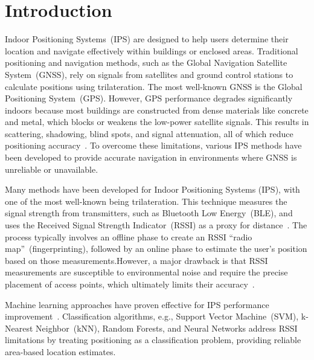 \documentclass[runningheads]{llncs}
\begin{document}

\section{Introduction}\label{sec:introduction}

Indoor Positioning Systems~(IPS) are designed to help users determine their location and navigate effectively within buildings or enclosed areas. Traditional positioning and navigation methods, such as the Global Navigation Satellite System~(GNSS), rely on signals from satellites and ground control stations to calculate positions using trilateration. The most well-known GNSS is the Global Positioning System~(GPS). However, GPS performance degrades significantly indoors because most buildings are constructed from dense materials like concrete and metal, which blocks or weakens the low-power satellite signals. This results in scattering, shadowing, blind spots, and signal attenuation, all of which reduce positioning accuracy~\cite{bgp1}. To overcome these limitations, various IPS methods have been developed to provide accurate navigation in environments where GNSS is unreliable or unavailable.

Many methods have been developed for Indoor Positioning Systems (IPS), with one of the most well-known being trilateration. This technique measures the signal strength from transmitters, such as Bluetooth Low Energy~(BLE), and uses the Received Signal Strength Indicator~(RSSI) as a proxy for distance~\cite{bg2}. The process typically involves an offline phase to create an RSSI ``radio map''~(fingerprinting), followed by an online phase to estimate the user's position based on those measurements.However, a major drawback is that RSSI measurements are susceptible to environmental noise and require the precise placement of access points, which ultimately limits their accuracy~\cite{bgp2}.

Machine learning approaches have proven effective for IPS performance improvement~\cite{bgp3}. Classification algorithms, e.g., Support Vector Machine~(SVM), k-Nearest Neighbor~(kNN), Random Forests, and Neural Networks address RSSI limitations by treating positioning as a classification problem, providing reliable area-based location estimates.
\end{document}
